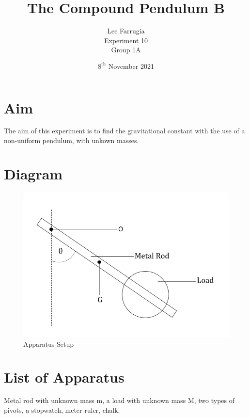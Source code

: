 \documentclass[12pt, a4paper]{article}
\title{The Compound Pendulum B}
\author{Lee Farrugia \\ Experiment 10 \\ Group 1A}
\date{$8^{\text{th}}$ November 2021}
\begin{document}
\maketitle

\section*{Aim}
The aim of this experiment is to find the gravitational constant with the use of a non-uniform pendulum, with unkown masses. 

\section*{Diagram}
\begin{figure}[H]
    \centering
    \includegraphics[width=\textwidth]{Experiment 10 Diagram.png}
    \caption{Apparatus Setup}
    \label{fig:set up}
\end{figure}

\section*{List of Apparatus}
Metal rod with unknown mass m, a load with unknown mass M, two types of pivots, a stopwatch, meter ruler, chalk.
\end{document}
